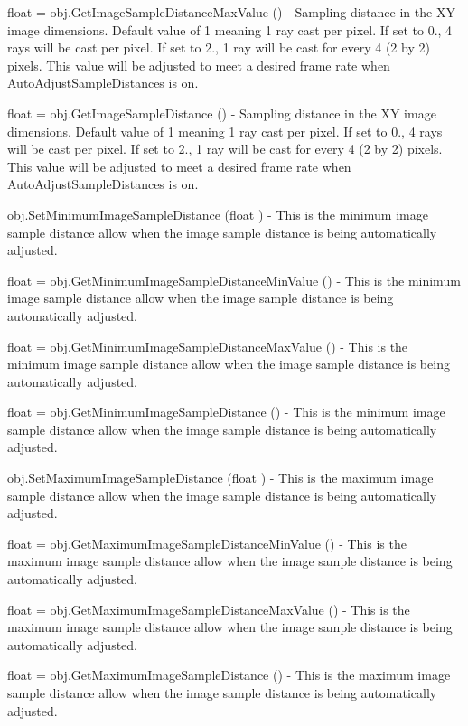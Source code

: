 \begin{DoxyItemize}
\item {\ttfamily float = obj.\-Get\-Image\-Sample\-Distance\-Max\-Value ()} -\/ Sampling distance in the X\-Y image dimensions. Default value of 1 meaning 1 ray cast per pixel. If set to 0., 4 rays will be cast per pixel. If set to 2., 1 ray will be cast for every 4 (2 by 2) pixels. This value will be adjusted to meet a desired frame rate when Auto\-Adjust\-Sample\-Distances is on.  
\item {\ttfamily float = obj.\-Get\-Image\-Sample\-Distance ()} -\/ Sampling distance in the X\-Y image dimensions. Default value of 1 meaning 1 ray cast per pixel. If set to 0., 4 rays will be cast per pixel. If set to 2., 1 ray will be cast for every 4 (2 by 2) pixels. This value will be adjusted to meet a desired frame rate when Auto\-Adjust\-Sample\-Distances is on.  
\item {\ttfamily obj.\-Set\-Minimum\-Image\-Sample\-Distance (float )} -\/ This is the minimum image sample distance allow when the image sample distance is being automatically adjusted.  
\item {\ttfamily float = obj.\-Get\-Minimum\-Image\-Sample\-Distance\-Min\-Value ()} -\/ This is the minimum image sample distance allow when the image sample distance is being automatically adjusted.  
\item {\ttfamily float = obj.\-Get\-Minimum\-Image\-Sample\-Distance\-Max\-Value ()} -\/ This is the minimum image sample distance allow when the image sample distance is being automatically adjusted.  
\item {\ttfamily float = obj.\-Get\-Minimum\-Image\-Sample\-Distance ()} -\/ This is the minimum image sample distance allow when the image sample distance is being automatically adjusted.  
\item {\ttfamily obj.\-Set\-Maximum\-Image\-Sample\-Distance (float )} -\/ This is the maximum image sample distance allow when the image sample distance is being automatically adjusted.  
\item {\ttfamily float = obj.\-Get\-Maximum\-Image\-Sample\-Distance\-Min\-Value ()} -\/ This is the maximum image sample distance allow when the image sample distance is being automatically adjusted.  
\item {\ttfamily float = obj.\-Get\-Maximum\-Image\-Sample\-Distance\-Max\-Value ()} -\/ This is the maximum image sample distance allow when the image sample distance is being automatically adjusted.  
\item {\ttfamily float = obj.\-Get\-Maximum\-Image\-Sample\-Distance ()} -\/ This is the maximum image sample distance allow when the image sample distance is being automatically adjusted.  

\end{DoxyItemize}
